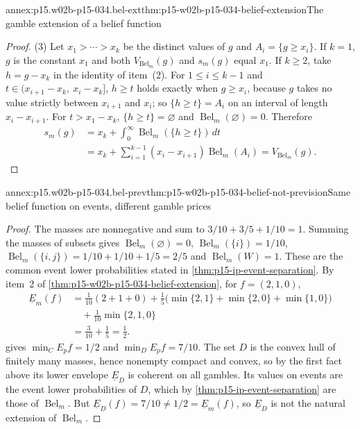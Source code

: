 \begin{annexitem}{annex:p15.w02b-p15-034.bel-ext}{thm:p15-w02b-p15-034-belief-extension}{The gamble extension of a belief function}
\begin{proof}
(3) Let \(x_1>\cdots>x_k\) be the distinct values of \(g\) and
\(A_i=\{g\geq x_i\}\). If \(k=1\), \(g\) is the constant \(x_1\) and
both \(V_{\operatorname{Bel}_m}(g)\) and \(s_m(g)\) equal \(x_1\). If
\(k\geq2\), take \(h=g-x_k\) in the identity of item~(2). For
\(1\leq i\leq k-1\) and \(t\in(x_{i+1}-x_k,\ x_i-x_k]\),
\(h\geq t\) holds exactly when \(g\geq x_i\), because \(g\) takes no value
strictly between \(x_{i+1}\) and \(x_i\); so \(\{h\geq t\}=A_i\) on an
interval of length \(x_i-x_{i+1}\). For \(t>x_1-x_k\),
\(\{h\geq t\}=\varnothing\) and \(\operatorname{Bel}_m(\varnothing)=0\).
Therefore
\[
\begin{aligned}
 s_m(g)&=x_k+\int_0^\infty\operatorname{Bel}_m(\{h\geq t\})\,dt\\
 &=x_k+\sum_{i=1}^{k-1}(x_i-x_{i+1})\operatorname{Bel}_m(A_i)
 =V_{\operatorname{Bel}_m}(g).
\end{aligned}
\]
\end{proof}
\end{annexitem}

\begin{annexitem}{annex:p15.w02b-p15-034.bel-prev}{thm:p15-w02b-p15-034-belief-not-prevision}{Same belief function on events, different gamble prices}
\begin{proof}
The masses are nonnegative and sum to \(3/10+3/5+1/10=1\). Summing the
masses of subsets gives \(\operatorname{Bel}_m(\varnothing)=0\),
\(\operatorname{Bel}_m(\{i\})=1/10\),
\(\operatorname{Bel}_m(\{i,j\})=1/10+1/10+1/5=2/5\) and
\(\operatorname{Bel}_m(W)=1\). These are the common event lower
probabilities stated in \cref{thm:p15-ip-event-separation}. By item~2 of
\cref{thm:p15-w02b-p15-034-belief-extension}, for \(f=(2,1,0)\),
\[
\begin{aligned}
 \underline E_m(f)&=\tfrac1{10}(2+1+0)
  +\tfrac15\bigl(\min\{2,1\}+\min\{2,0\}+\min\{1,0\}\bigr)\\
 &\quad+\tfrac1{10}\min\{2,1,0\}\\
 &=\tfrac3{10}+\tfrac15=\tfrac12 .
\end{aligned}
\]
 gives \(\min_CE_pf=1/2\) and
\(\min_DE_pf=7/10\). The set \(D\) is the convex hull of finitely many
masses, hence nonempty compact and convex, so by the first fact above its
lower envelope \(\underline E_D\) is coherent on all gambles. Its values on
events are the event lower probabilities of \(D\), which by
\cref{thm:p15-ip-event-separation} are those of \(\operatorname{Bel}_m\).
But \(\underline E_D(f)=7/10\ne1/2=\underline E_m(f)\), so
\(\underline E_D\) is not the natural extension of
\(\operatorname{Bel}_m\).
\end{proof}
\end{annexitem}

